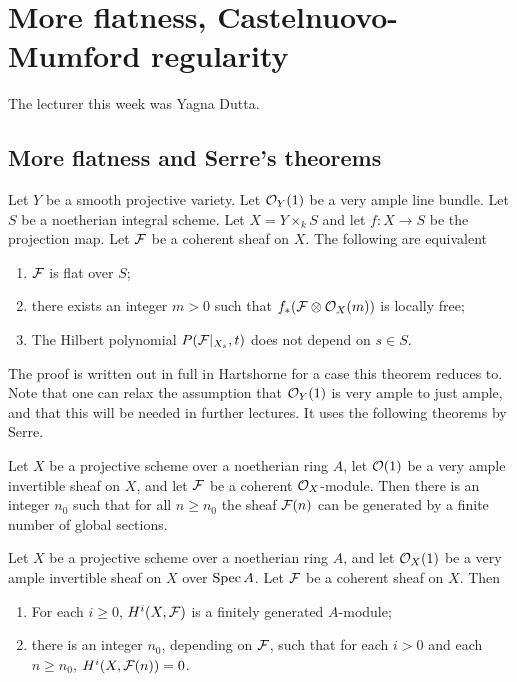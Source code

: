 \chapter{More flatness, Castelnuovo-Mumford regularity}
The lecturer this week was Yagna Dutta.
\section{More flatness and Serre's theorems}
\begin{theorem}\label{thm:flat-hilbert-constant}
	Let $Y$ be a smooth projective variety. Let $\mathcal{O}_Y(1)$ be a very ample line bundle. Let $S$ be a noetherian integral scheme. Let $X = Y\times_k S$ and let $f: X \to S$ be the projection map. Let $\mathcal{F}$ be a coherent sheaf on $X$. The following are equivalent 
	\begin{enumerate}[label=(\roman*)]
    	\item $\mathcal{F}$ is flat over $S$; 
		\item there exists an integer $m > 0$ such that $f_*(\mathcal{F}\otimes \mathcal{O}_X(m))$ is locally free;
		\item The Hilbert polynomial $P(\mathcal{F}|_{X_s}, t)$ does not depend on $s \in S$. 
    \end{enumerate}
\end{theorem}
The proof is written out in full in Hartshorne for a case this theorem reduces to. Note that one can relax the assumption that $\mathcal{O}_Y(1)$ is very ample to just ample, and that this will be needed in further lectures. It uses the following theorems by Serre. 
\begin{theorem}
	Let $X$ be a projective scheme over a noetherian ring $A$, let $\mathcal{O}(1)$ be a very ample invertible sheaf on $X$, and let $\mathcal{F}$ be a coherent $\mathcal{O}_X$-module. Then there is an integer $n_0$ such that for all $n \geq n_0$ the sheaf $\mathcal{F}(n)$ can be generated by a finite number of global sections.
\end{theorem}
\begin{theorem}
	Let $X$ be a projective scheme over a noetherian ring $A$, and let $\mathcal{O}_X(1)$ be a very ample invertible sheaf on $X$ over $\operatorname{Spec} A$. Let $\mathcal{F}$ be a coherent sheaf on $X$. Then \begin{enumerate}[label=(\alph*)]
    	\item For each $i \geq 0$, $H^i(X, \mathcal{F})$ is a finitely generated $A$-module;
		\item there is an integer $n_0$, depending on $\mathcal{F}$, such that for each $i > 0$ and each $n \geq n_0$, $H^i(X, \mathcal{F}(n)) = 0$.
    \end{enumerate}
\end{theorem}
